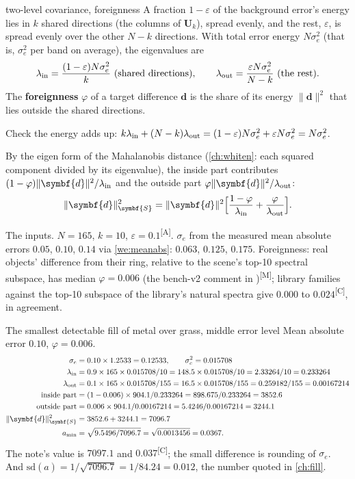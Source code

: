 \documentclass[11pt,a4paper,oneside,openany]{book}
\newcommand{\B}[1]{{\symbf{#1}}}
\newcommand{\B}[1]{{\bm{#1}}}
\newcommand{\meas}{\textsuperscript{\textsf{\scriptsize[M]}}}
\newcommand{\comp}{\textsuperscript{\textsf{\scriptsize[C]}}}
\newcommand{\assm}{\textsuperscript{\textsf{\scriptsize[A]}}}
\newcommand{\nrm}[1]{\lVert #1\rVert}
\newcommand{\vd}{\B{d}}
\newcommand{\mS}{\B{S}}
\newcommand{\mU}{\B{U}}
\newcommand{\ahat}{\hat a}
\begin{document}
\begin{defn}{two-level covariance, foreignness}
A fraction $1-\varepsilon$ of the background error's energy lies in $k$ shared directions (the columns of $\mU_k$), spread evenly, and the rest,
$\varepsilon$, is spread evenly over the other $N-k$ directions. With total error energy $N\sigma_e^2$ (that is, $\sigma_e^2$ per band on average),
the eigenvalues are
\[
  \lambda_{\rm in}=\frac{(1-\varepsilon)N\sigma_e^2}{k}\ \text{(shared directions)},\qquad
  \lambda_{\rm out}=\frac{\varepsilon N\sigma_e^2}{N-k}\ \text{(the rest)}.
\]
The \textbf{foreignness} $\varphi$ of a target difference $\vd$ is the share of its energy $\nrm{\vd}^2$ that lies outside the shared directions.
\end{defn}

Check the energy adds up: $k\lambda_{\rm in}+(N-k)\lambda_{\rm out}=(1-\varepsilon)N\sigma_e^2+\varepsilon N\sigma_e^2=N\sigma_e^2$.

By the eigen form of the Mahalanobis distance (\cref{ch:whiten}: each squared component divided by its eigenvalue), the inside part
contributes $(1-\varphi)\nrm{\vd}^2/\lambda_{\rm in}$ and the outside part $\varphi\nrm{\vd}^2/\lambda_{\rm out}$:
\[
  \nrm{\vd}^2_{\mS}=\nrm{\vd}^2\Big[\frac{1-\varphi}{\lambda_{\rm in}}+\frac{\varphi}{\lambda_{\rm out}}\Big].
\]

The inputs. $N=165$, $k=10$, $\varepsilon=0.1$\assm. $\sigma_e$ from the measured mean absolute errors $0.05$, $0.10$, $0.14$ via \cref{we:meanabs}:
$0.063$, $0.125$, $0.175$. Foreignness: real objects' difference from their ring, relative to the scene's top-10 spectral subspace, has median
$\varphi=0.006$ (the bench-v2 comment in )\meas; library families against the top-10 subspace of the library's natural spectra give
$0.000$ to $0.024$\comp, in agreement.

\begin{worked}[label=we:amin]{The smallest detectable fill of metal over grass, middle error level}
Mean absolute error $0.10$, $\varphi=0.006$.
\begin{align*}
\sigma_e &= 0.10\times1.2533=0.12533,\qquad \sigma_e^2=0.015708\\
\lambda_{\rm in} &= 0.9\times165\times0.015708/10=148.5\times0.015708/10=2.33264/10=0.233264\\
\lambda_{\rm out} &= 0.1\times165\times0.015708/155=16.5\times0.015708/155=0.259182/155=0.00167214\\
\text{inside part} &= (1-0.006)\times904.1/0.233264=898.675/0.233264=3852.6\\
\text{outside part} &= 0.006\times904.1/0.00167214=5.4246/0.00167214=3244.1\\
\nrm{\vd}^2_{\mS} &= 3852.6+3244.1=7096.7\\
a_{\min} &= \sqrt{9.5496/7096.7}=\sqrt{0.0013456}=0.0367 .
\end{align*}
The note's value is $7097.1$ and $0.037$\comp; the small difference is rounding of $\sigma_e$. And $\mathrm{sd}(\ahat)=1/\sqrt{7096.7}=1/84.24=0.012$, the
number quoted in \cref{ch:fill}.
\end{worked}
\end{document}
